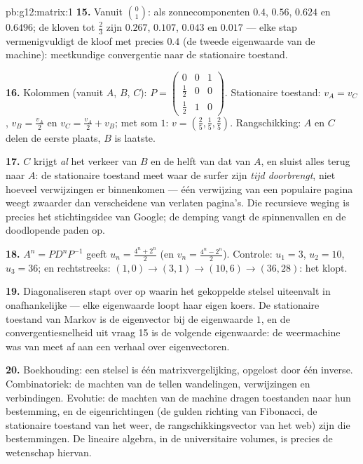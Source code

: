 \begin{solution}{pb:g12:matrix:1}
\textbf{15.} Vanuit $\binom01$: als zonnecomponenten $0.4$, $0.56$, $0.624$ en
$0.6496$; de kloven tot $\frac23$ zijn $0.267$, $0.107$, $0.043$ en $0.017$
--- elke stap vermenigvuldigt de kloof met precies $0.4$ (de tweede
eigenwaarde van de machine): meetkundige convergentie naar de stationaire
toestand.

\textbf{16.} Kolommen (vanuit $A$, $B$, $C$):
$P = \begin{pmatrix} 0 & 0 & 1\\ \frac12 & 0 & 0\\
\frac12 & 1 & 0\end{pmatrix}$. Stationaire toestand: $v_A = v_C$,
$v_B = \frac{v_A}{2}$ en $v_C = \frac{v_A}{2} + v_B$; met som $1$:
$v = \left(\frac25, \frac15, \frac25\right)$. Rangschikking: $A$ en $C$ delen
de eerste plaats, $B$ is laatste.

\textbf{17.} $C$ krijgt \emph{al} het verkeer van $B$ en de helft van dat van
$A$, en sluist alles terug naar $A$: de stationaire toestand meet waar de
surfer zijn \emph{tijd doorbrengt}, niet hoeveel verwijzingen er binnenkomen
--- één verwijzing van een populaire pagina weegt zwaarder dan verscheidene
van verlaten pagina's. Die recursieve weging is precies het stichtingsidee van
Google; de demping vangt de spinnenvallen en de doodlopende paden op.

\textbf{18.} $A^n = P D^n P^{-1}$ geeft $u_n = \frac{4^n + 2^n}{2}$ (en
$v_n = \frac{4^n - 2^n}{2}$). Controle: $u_1 = 3$, $u_2 = 10$, $u_3 = 36$; en
rechtstreeks: $(1,0) \to (3,1) \to (10,6) \to (36, 28)$: het klopt.

\textbf{19.} Diagonaliseren stapt over op  waarin het gekoppelde
stelsel uiteenvalt in onafhankelijke  --- elke eigenwaarde
loopt haar eigen koers. De stationaire toestand van Markov is de eigenvector
bij de eigenwaarde $1$, en de convergentiesnelheid uit vraag 15 is de volgende
eigenwaarde: de weermachine was van meet af aan een verhaal over
eigenvectoren.

\textbf{20.} Boekhouding: een stelsel is één matrixvergelijking, opgelost door
één inverse. Combinatoriek: de machten van de  tellen
wandelingen, verwijzingen en verbindingen. Evolutie: de machten van de machine
dragen toestanden naar hun bestemming, en de eigenrichtingen (de gulden
richting van Fibonacci, de stationaire toestand van het weer, de
rangschikkingsvector van het web) zijn die bestemmingen. De lineaire algebra,
in de universitaire volumes, is precies de wetenschap hiervan.
\end{solution}
